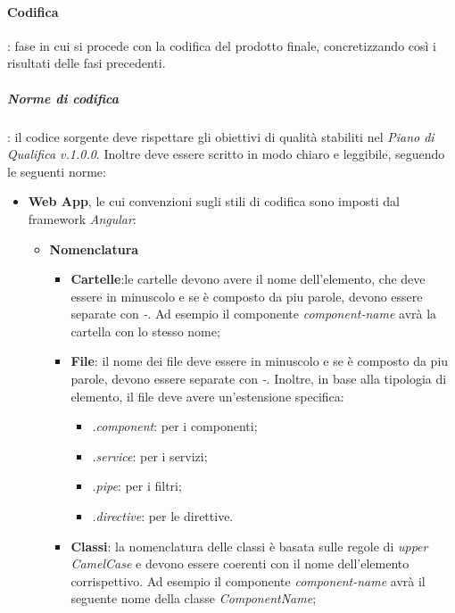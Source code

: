 \paragraph{Codifica}: fase in cui si procede con la codifica del prodotto finale, concretizzando così i risultati delle fasi precedenti.
\subparagraph{Norme di codifica}: il codice sorgente deve rispettare gli obiettivi di qualità stabiliti nel \textit{Piano di Qualifica v.1.0.0}. \newline
Inoltre deve essere scritto in modo chiaro e leggibile, seguendo le seguenti norme:
\begin{itemize}
    \item \textbf{Web App}, le cui convenzioni sugli stili di codifica sono imposti dal framework \textit{Angular}:
    \begin{itemize}
        \item \textbf{Nomenclatura}
        \begin{itemize}
            \item \textbf{Cartelle}:le cartelle devono avere il nome dell'elemento, che deve essere in minuscolo e se è composto da piu parole, devono essere separate con \textit{-}. \newline
            Ad esempio il componente \textit{component-name} avrà la cartella con lo stesso nome;
            \item \textbf{File}: il nome dei file deve essere in minuscolo e se è composto da piu parole, devono essere separate con \textit{-}. \newline
            Inoltre, in base alla tipologia di elemento, il file deve avere un'estensione specifica:
            \begin{itemize}
                \item \textit{.component}: per i componenti;
                \item \textit{.service}: per i servizi;
                \item \textit{.pipe}: per i filtri;
                \item \textit{.directive}: per le direttive.
            \end{itemize}
            \item \textbf{Classi}: la nomenclatura delle classi è basata sulle regole di \textit{upper CamelCase} e devono essere coerenti con il nome dell'elemento corrispettivo. \newline
            Ad esempio il componente \textit{component-name} avrà il seguente nome della classe \textit{ComponentName};

\end{itemize}
\end{itemize}
\end{itemize}
